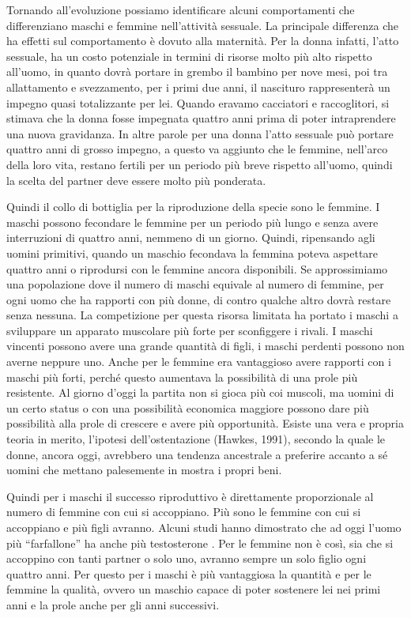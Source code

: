 \documentclass[12pt]{book} %
\begin{document}
Tornando all'evoluzione possiamo identificare alcuni comportamenti che differenziano maschi e
femmine nell'attività sessuale. La principale differenza che ha effetti sul comportamento è dovuto
alla maternità. Per la donna infatti, l'atto sessuale, ha un costo potenziale in termini di
risorse molto più alto rispetto all'uomo, in quanto dovrà portare in grembo il bambino per nove
mesi, poi tra allattamento e svezzamento, per i primi due anni, il nascituro rappresenterà un impegno quasi
totalizzante per lei. Quando eravamo cacciatori e raccoglitori, si stimava che la donna fosse impegnata quattro anni
prima di poter intraprendere una nuova gravidanza. In altre parole per una donna l'atto sessuale
può portare quattro anni di grosso impegno, a questo va aggiunto che le femmine, nell'arco della
loro vita, restano fertili per un periodo più breve rispetto all'uomo, quindi la scelta del
partner deve essere molto più ponderata.

Quindi il collo di bottiglia per la riproduzione della specie sono le femmine. I maschi possono fecondare le femmine per
un periodo più lungo e senza avere interruzioni di quattro anni, nemmeno di un giorno. Quindi, ripensando agli uomini
primitivi, quando un maschio fecondava la femmina poteva aspettare quattro anni o riprodursi con le femmine ancora
disponibili. Se approssimiamo una popolazione dove il numero di maschi equivale al numero di femmine, per ogni uomo che
ha rapporti con più donne, di contro qualche altro dovrà restare senza nessuna. La competizione per questa risorsa
limitata ha portato i maschi a sviluppare un apparato muscolare più forte per sconfiggere i rivali. I maschi vincenti
possono avere una grande quantità di figli, i maschi perdenti possono non averne neppure uno. Anche per le femmine era
vantaggioso avere rapporti con i maschi più forti, perché questo aumentava la possibilità di una prole più resistente.
Al giorno d'oggi la partita non si gioca più coi muscoli, ma uomini di un certo status o con una
possibilità economica maggiore possono dare più possibilità alla prole di crescere e avere più opportunità. Esiste una
vera e propria teoria in merito, l'ipotesi dell'ostentazione (Hawkes, 1991),
secondo la quale le donne, ancora oggi, avrebbero una tendenza ancestrale a preferire accanto a sé uomini che mettano
palesemente in mostra i propri beni. 

Quindi per i maschi il successo riproduttivo è direttamente proporzionale al numero di femmine con cui si accoppiano.
Più sono le femmine con cui si accoppiano e più figli avranno. Alcuni studi hanno dimostrato che ad oggi l'uomo più
“farfallone” ha anche più testosterone   . Per le femmine non è così, sia che si accoppino con tanti partner o solo uno,
avranno sempre un solo figlio ogni quattro anni. Per questo per i maschi è più vantaggiosa la quantità e per le femmine
la qualità, ovvero un maschio capace di poter sostenere lei nei primi anni e la prole anche per gli anni successivi.
\end{document}
